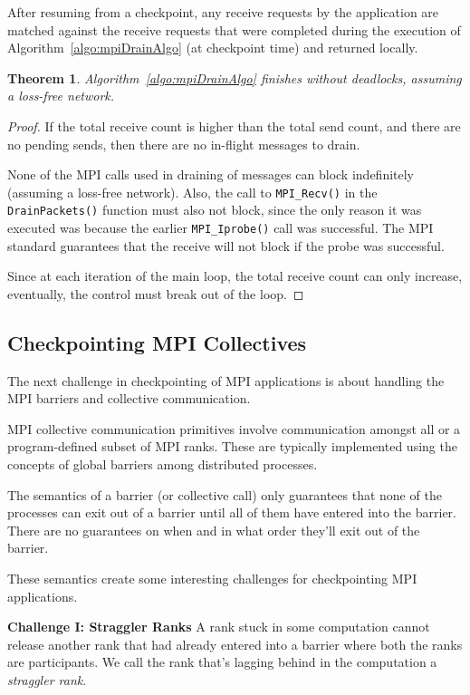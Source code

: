 \documentclass[11pt,letter]{article}
\newtheorem{theorem}{Theorem}
\begin{document}
After resuming from a checkpoint, any receive requests by the application
are matched against the receive requests that were completed during the
execution of Algorithm~\ref{algo:mpiDrainAlgo} (at checkpoint time) and
returned locally.

\begin{theorem}
  Algorithm~\ref{algo:mpiDrainAlgo} finishes without deadlocks, assuming
  a loss-free network.
\end{theorem}

\begin{proof}
  If the total receive count is higher than the total send count, and there
  are no pending sends, then there are no in-flight messages to drain.

  None of the MPI calls used in draining of messages can block indefinitely
  (assuming a loss-free network). Also, the call to \texttt{MPI\_Recv()} in
  the \texttt{DrainPackets()} function must also not block, since the only
  reason it was executed was because the earlier \texttt{MPI\_Iprobe()} call
  was successful. The MPI standard guarantees that the receive will not block
  if the probe was successful.

  Since at each iteration of the main loop, the total receive count can
  only increase, eventually, the control must break out of the loop.
\end{proof}

\subsection{Checkpointing MPI Collectives}

The next challenge in checkpointing of MPI applications is about handling
the MPI barriers and collective communication.

MPI collective communication primitives involve communication amongst all or
a program-defined subset of MPI ranks. These are typically implemented using
the concepts of global barriers among distributed processes.

The semantics of a barrier (or collective call) only guarantees that none of
the processes can exit out of a barrier until all of them have entered into the
barrier. There are no guarantees on when and in what order they'll exit out
of the barrier.

These semantics create some interesting challenges for checkpointing MPI
applications.

\noindent \textbf{Challenge I: Straggler Ranks} A rank stuck in some
computation cannot release another rank that had already entered into a barrier
where both the ranks are participants. We call the rank that's lagging behind
in the computation a {\em straggler rank}.
\end{document}

